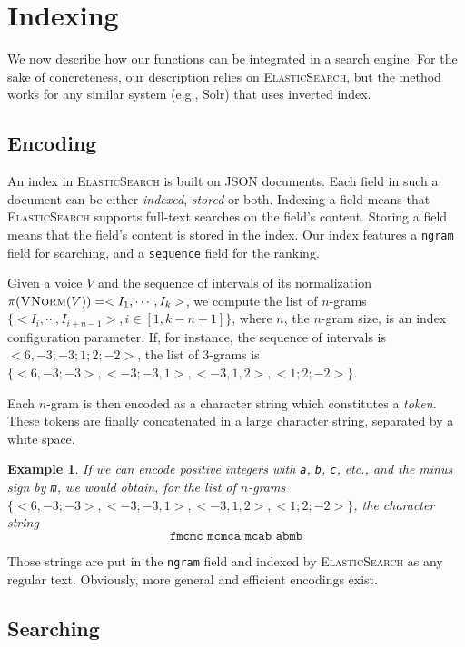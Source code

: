 \documentclass[letterpaper, 11pt]{article}
\newtheorem{Example}{Example}
\def\elasticsearch/{\textsc{ElasticSearch}}
\begin{document}
\section{Indexing}\label{sec:implem}

We now describe how our functions can be integrated in a search engine. For the sake of
concreteness, our description relies on \elasticsearch/, but the method works for any similar system (e.g., Solr)
that uses inverted index.

\subsection{Encoding}

An index in \elasticsearch/ is built on JSON documents. Each field in such a document can be either \emph{indexed}, \emph{stored}
or both. Indexing a field means that \elasticsearch/ supports full-text searches on the field's content.
Storing a field means that the field's content is stored in the index.
Our index features a \texttt{ngram} field for searching, and a \texttt{sequence} field for the ranking. 

Given a voice $V$ 
and the sequence of intervals of its normalization  $\pi(\textsc{VNorm}(V)) = <I_1, \cdots, I_k>$,
we compute the list of $n$-grams $\{<I_i, \cdots, I_{i+n-1}>, i \in [1, k-n+1]\}$, where $n$, the $n$-gram size,
is an index configuration parameter. If, for instance, the sequence of intervals is
$<6, -3; -3; 1; 2; -2>$, the list of $3$-grams is  $\{<6, -3; -3>, <-3; -3, 1>, <-3,1,2>, <1; 2; -2>\}$.

Each $n$-gram is then encoded as a character string which constitutes a \emph{token}. These
tokens are finally concatenated in a large character string, separated by a white space.

\begin{Example}
If we can encode positive integers with \texttt{a}, \texttt{b}, \texttt{c}, etc.,
and the minus sign by \texttt{m}, we would obtain, for the  list of $n$-grams
$\{<6, -3; -3>, <-3; -3, 1>, <-3,1,2>, <1; 2; -2>\}$, the character
string 
$$\texttt{fmcmc mcmca mcab abmb}$$ 
\end{Example}

Those strings are put in the \texttt{ngram} field and indexed by \elasticsearch/ as any regular text.
Obviously, more general and efficient encodings exist.

\subsection{Searching}
\end{document}
